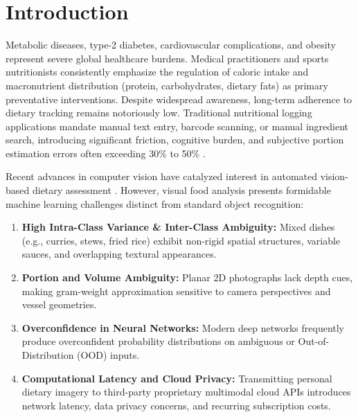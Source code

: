 \documentclass[conference]{IEEEtran}
\begin{document}
\section{Introduction}
Metabolic diseases, type-2 diabetes, cardiovascular complications, and obesity represent severe global healthcare burdens. Medical practitioners and sports nutritionists consistently emphasize the regulation of caloric intake and macronutrient distribution (protein, carbohydrates, dietary fats) as primary preventative interventions. Despite widespread awareness, long-term adherence to dietary tracking remains notoriously low. Traditional nutritional logging applications mandate manual text entry, barcode scanning, or manual ingredient search, introducing significant friction, cognitive burden, and subjective portion estimation errors often exceeding 30\% to 50\% \cite{schoeller1990}.

Recent advances in computer vision have catalyzed interest in automated vision-based dietary assessment \cite{zhu2010}. However, visual food analysis presents formidable machine learning challenges distinct from standard object recognition:
\begin{enumerate}
    \item \textbf{High Intra-Class Variance \& Inter-Class Ambiguity:} Mixed dishes (e.g., curries, stews, fried rice) exhibit non-rigid spatial structures, variable sauces, and overlapping textural appearances.
    \item \textbf{Portion and Volume Ambiguity:} Planar 2D photographs lack depth cues, making gram-weight approximation sensitive to camera perspectives and vessel geometries.
    \item \textbf{Overconfidence in Neural Networks:} Modern deep networks frequently produce overconfident probability distributions on ambiguous or Out-of-Distribution (OOD) inputs.
    \item \textbf{Computational Latency and Cloud Privacy:} Transmitting personal dietary imagery to third-party proprietary multimodal cloud APIs introduces network latency, data privacy concerns, and recurring subscription costs.
\end{enumerate}
\end{document}
